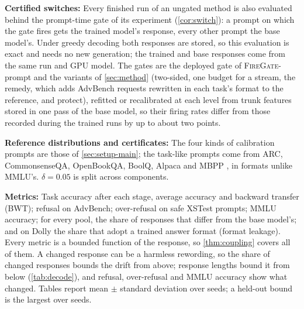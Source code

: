 \documentclass{article}
\theoremstyle{plain}
\theoremstyle{definition}
\theoremstyle{remark}
\newcommand{\methodp}{\textsc{FireGate}-prompt}
\begin{document}
\textbf{Certified switches:} Every finished run of an ungated method is also evaluated behind the prompt-time
gate of its experiment (\cref{cor:switch}): a prompt on which the gate fires gets the trained model's
response, every other prompt the base model's. Under greedy decoding both responses are stored, so this evaluation
is exact and needs no new generation; the trained and base responses come from the same run and GPU model. The gates are
the deployed gate of \methodp{} and the variants of \cref{sec:method} (two-sided, one budget for a stream, the remedy,
which adds AdvBench requests rewritten in each task's format to the reference, and protect), refitted or recalibrated
at each level from trunk features stored in one pass of the base model, so their firing rates differ from those
recorded during the trained runs by up to about two points.

\textbf{Reference distributions and certificates:} The four kinds of calibration prompts are those of
\cref{sec:setup-main}; the task-like prompts come from ARC, CommonsenseQA, OpenBookQA, BoolQ, Alpaca and MBPP
\citep{clark2018arc,talmor2019commonsenseqa,mihaylov2018openbookqa,clark2019boolq,taori2023alpaca,austin2021mbpp},
in formats unlike MMLU's. $\delta=0.05$ is split across components.

\textbf{Metrics:} Task accuracy after each stage, average accuracy and backward transfer (BWT); refusal on AdvBench;
over-refusal on safe XSTest prompts; MMLU accuracy; for every pool, the share of responses that differ from the
base model's; and on Dolly the share that adopt a trained answer format (format leakage). Every metric is a bounded
function of the response, so \cref{thm:coupling} covers all of them. A changed response can be a harmless rewording, so
the share of changed responses bounds the drift from above; response lengths bound it from below (\cref{tab:decode}),
and refusal, over-refusal and MMLU accuracy show what changed. Tables report mean $\pm$ standard deviation over
seeds; a held-out bound is the largest over seeds.
\end{document}
